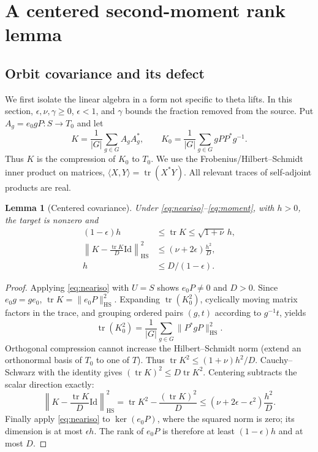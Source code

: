 \documentclass[11pt]{article}
\newtheorem{lemma}[theorem]{Lemma}
\theoremstyle{remark}\newtheorem{remark}[theorem]{Remark}
\newcommand{\tr}{\operatorname{tr}}
\newcommand{\HS}{\mathrm{HS}}
\newcommand{\id}{\mathrm{Id}}
\begin{document}
\section{A centered second-moment rank lemma}
\subsection{Orbit covariance and its defect}
We first isolate the linear algebra in a form not specific to theta lifts. In this section, $\epsilon,\nu,\gamma\ge0$, $\epsilon<1$, and $\gamma$ bounds the fraction removed from the source. Put $A_g=e_0gP:S\to T_0$ and let
\[
K=\frac1{|G|}\sum_{g\in G}A_gA_g^*,\qquad K_0=\frac1{|G|}\sum_{g\in G}gPP^*g^{-1}.
\]
Thus $K$ is the compression of $K_0$ to $T_0$. We use the Frobenius/Hilbert--Schmidt inner product on matrices, $\langle X,Y\rangle=\tr(X^*Y)$. All relevant traces of self-adjoint products are real.

\begin{lemma}[Centered covariance]\label{lem:cov}
Under \eqref{eq:neariso}--\eqref{eq:moment}, with $h>0$, the target is nonzero and
\begin{align*}
(1-\epsilon)h&\le\tr K\le\sqrt{1+\nu}\,h,\\
\left\|K-\frac{\tr K}{D}\id\right\|_{\HS}^2&\le(\nu+2\epsilon)\frac{h^2}{D},\\
h&\le D/(1-\epsilon).
\end{align*}
\end{lemma}
\begin{proof}
Applying \eqref{eq:neariso} with $U=S$ shows $e_0P\ne0$ and $D>0$. Since $e_0g=ge_0$, $\tr K=\|e_0P\|_{\HS}^2$. Expanding $\tr(K_0^2)$, cyclically moving matrix factors in the trace, and grouping ordered pairs $(g,t)$ according to $g^{-1}t$, yields
\[
\tr(K_0^2)=\frac1{|G|}\sum_{g\in G}\|P^*gP\|_{\HS}^2.
\]
Orthogonal compression cannot increase the Hilbert--Schmidt norm (extend an orthonormal basis of $T_0$ to one of $T$). Thus $\tr K^2\le (1+\nu)h^2/D$. Cauchy--Schwarz with the identity gives $(\tr K)^2\le D\tr K^2$. Centering subtracts the scalar direction exactly:
\[
\left\|K-\frac{\tr K}{D}\id\right\|_{\HS}^2=\tr K^2-\frac{(\tr K)^2}{D}
\le(\nu+2\epsilon-\epsilon^2)\frac{h^2}{D}.
\]
Finally apply \eqref{eq:neariso} to $\ker(e_0P)$, where the squared norm is zero; its dimension is at most $\epsilon h$. The rank of $e_0P$ is therefore at least $(1-\epsilon)h$ and at most $D$.
\end{proof}
\end{document}
